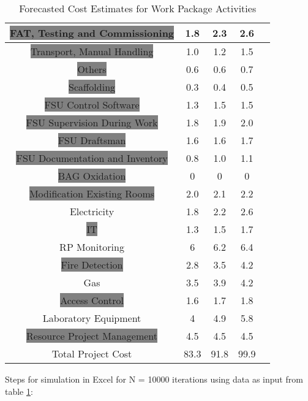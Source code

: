 \begin{table}[ht]
\begin{center}
\begin{tabular}{ |c|c|c|c|c|}
		\hline
		\colorbox{Gray}{FAT, Testing and Commissioning }		&1.8   							& 	2.3				&2.6\\
		\hline
		\colorbox{Gray}{Transport, Manual Handling }	&1.0   & 1.2	&1.5\\
		\hline
		\colorbox{Gray}{Others}			&0.6   		& 	0.6			&0.7\\
		\hline
		\colorbox{Gray}{Scaffolding}		&0.3   							& 	0.4				& 0.5\\
		\hline
		\colorbox{Gray}{FSU Control Software}		&1.3   							& 		1.5			&1.5\\
		\hline
		\colorbox{Gray}{FSU Supervision During Work}	&1.8   		& 		1.9			&2.0\\
		\hline
		\colorbox{Gray}{FSU Draftsman}		&1.6   			& 	1.6				&1.7\\
		\hline
		\colorbox{Gray}{FSU Documentation and Inventory}	&0.8  							& 			1.0		&1.1\\
		\hline
		\colorbox{Gray}{BAG Oxidation}										&0   							& 	0				&0\\
		\hline
		\colorbox{Gray}{Modification Existing Rooms}	&2.0 							& 		2.1			&2.2\\
		\hline
		\colorbox{Melon}{Electricity}		&1.8   							& 	2.2				&2.6\\
		\hline
		\colorbox{Gray}{IT}		&1.3   							& 	1.5				&1.7\\
		\hline
		\colorbox{Melon}{RP Monitoring}		&6  							& 	6.2				&6.4\\
		\hline
		\colorbox{Gray}{Fire Detection}			&2.8  							& 	3.5				&4.2\\
		\hline
		\colorbox{Melon}{Gas }		&3.5					& 			3.9		&4.2\\
		\hline
		\colorbox{Gray}{Access Control}			&1.6						& 	1.7					&1.8   \\
		\hline
		\colorbox{Melon}{Laboratory Equipment}			&4   							& 	4.9				&5.8\\
		\hline
		\colorbox{Gray}{Resource Project Management}			&4.5							& 	4.5			&4.5\\
		\hline
		Total Project 	Cost								&83.3							& 91.8				&99.9\\
		\hline
	\end{tabular}
\end{center}
\caption[Forecasted Cost Estimates for Work Package Activities]{Forecasted Cost Estimates for Work Package Activities}
\label{tab:caption2}
\end{table}%

Steps for simulation in Excel for N = 10000 iterations using data as input from table \ref{tab:caption2}:

